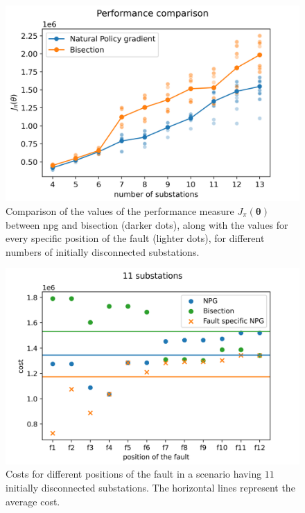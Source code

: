 \begin{figure}[htb]
    \centering
    \includegraphics[scale=0.8]{chapters/figures/comparison_graph_scatterplot.png}
    \caption{Comparison of the values of the performance measure $J_\pi (\boldsymbol \theta)$ between \acrshort{npg} and bisection (darker dots), along with the values for every specific position of the fault (lighter dots), for different numbers of initially disconnected substations.}
    \label{fig:comparison-scatterplot}
\end{figure}

\begin{figure}[htb]
    \centering
    \includegraphics[scale=0.8]{chapters/figures/scatterplot.png}
    \caption{Costs for different positions of the fault in a scenario having $11$ initially disconnected substations. The horizontal lines represent the average cost.}
    \label{fig:scatterplot}
\end{figure}

